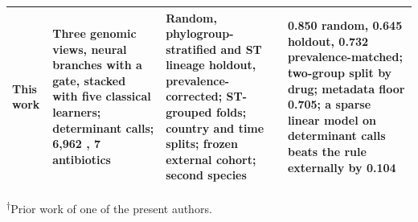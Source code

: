 \begin{table}[t]
\begin{tabularx}{\linewidth}{p{2.4cm}p{4.2cm}p{3.0cm}X}
\midrule
\textbf{This work} & \textbf{Three genomic views, neural branches with a gate, stacked with five classical learners; determinant calls; 6,962 \Ecoli{}, 7 antibiotics} & \textbf{Random, phylogroup-stratified and ST lineage holdout, prevalence-corrected; ST-grouped folds; country and time splits; frozen external cohort; second species} & \textbf{0.850 random, 0.645 holdout, 0.732 prevalence-matched; two-group split by drug; metadata floor 0.705; a sparse linear model on determinant calls beats the rule externally by 0.104} \\
\bottomrule
\end{tabularx}

\vspace{0.3em}
\noindent\footnotesize\textsuperscript{$\dagger$}Prior work of one of the present authors.
\end{table}

